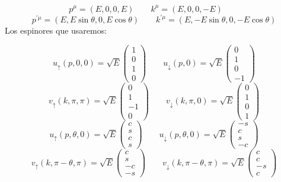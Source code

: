 \begin{equation}
    p^\mu= (E,0,0,E) \qquad 
    k^{\mu}= (E,0,0,-E) \qquad 
\end{equation}
\begin{equation}
    p^{\prime\mu}= (E,E\sin \theta,0,E\cos \theta) \qquad 
    k^{\prime\mu}= (E,-E\sin \theta,0,-E \cos \theta)
\end{equation}
Los espinores que usaremos:

\begin{equation} 
	u_\uparrow(p,0,0)= \sqrt{E} \begin{pmatrix}
		1 \\ 0 \\ 1 \\ 0
	\end{pmatrix} \qquad 
	u_\downarrow(p,0)= \sqrt{E} \begin{pmatrix}
		0 \\ 1 \\ 0 \\ -1
	\end{pmatrix}
\end{equation}
\begin{equation}
	v_\uparrow(k,\pi,\pi) = \sqrt{E} \begin{pmatrix}
		0 \\ 1 \\ -1 \\ 0
	\end{pmatrix}  \qquad 
	v_\downarrow(k,\pi,0) = \sqrt{E} \begin{pmatrix}
		0 \\ 1 \\ 0 \\ 1
	\end{pmatrix} 
\end{equation}
\begin{equation} 
	u_\uparrow(p,\theta,0)= \sqrt{E} \begin{pmatrix}
		c \\ s \\ c \\ s
	\end{pmatrix} \qquad 
	u_\downarrow(p,\theta,0)= \sqrt{E} \begin{pmatrix}
		-s \\ c \\ s \\ -c
	\end{pmatrix}
\end{equation}
\begin{equation}
	v_\uparrow(k,\pi-\theta,\pi) = \sqrt{E} \begin{pmatrix}
		c \\ s \\ -c \\ -s
	\end{pmatrix}  \qquad 
	v_\downarrow(k,\pi-\theta,\pi) = \sqrt{E} \begin{pmatrix}
		c \\ c \\ -s \\ c
	\end{pmatrix} 
\end{equation}
